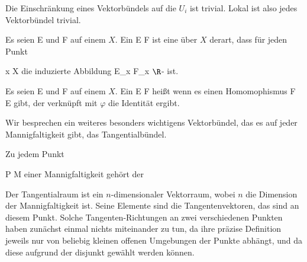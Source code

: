 Die Einschränkung eines Vektorbündels auf die $U_i$ ist trivial. Lokal ist also jedes Vektorbündel trivial.


{}
{





Es seien
\mathkor {} {E} {und} {F} {}
auf einem
$X$. Ein
\maabb {\varphi} { E } { F
} {}
ist eine
über $X$ derart, dass für jeden Punkt

\mavergleichskette
{\vergleichskette
{ x
}
{ \in }{ X
}
{  }{
}
{    }{
}
{   }{
}
}
{}{}{}
die induzierte Abbildung
 { E_x} {F_x
} {}
$\R$-
ist.





}


{}
{





Es seien
\mathkor {} {E} {und} {F} {}
auf einem
$X$. Ein
\maabb {\varphi} { E } { F
} {}
heißt
wenn es einen Homomophismus
\maabb {\psi} { F } { E
} {}
gibt, der verknüpft mit $\varphi$
 {} {} die Identität ergibt.





}






Wir besprechen ein weiteres besonders wichtigens Vektorbündel, das es auf jeder Mannigfaltigkeit gibt, das Tangentialbündel.

Zu jedem Punkt

\mavergleichskette
{\vergleichskette
{P
}
{ \in }{M
}
{  }{
}
{    }{
}
{   }{
}
}
{}{}{}
einer Mannigfaltigkeit gehört der

 Der Tangentialraum ist ein $n$-dimensionaler Vektorraum, wobei $n$ die Dimension der Mannigfaltigkeit ist. Seine Elemente sind die Tangentenvektoren, das sind  an diesem Punkt. Solche Tangen\-ten-Richtungen an zwei verschiedenen Punkten haben zunächst einmal nichts miteinander zu tun, da ihre präzise Definition jeweils nur von beliebig kleinen offenen Umgebungen der Punkte abhängt, und da diese aufgrund der
disjunkt gewählt werden können.

